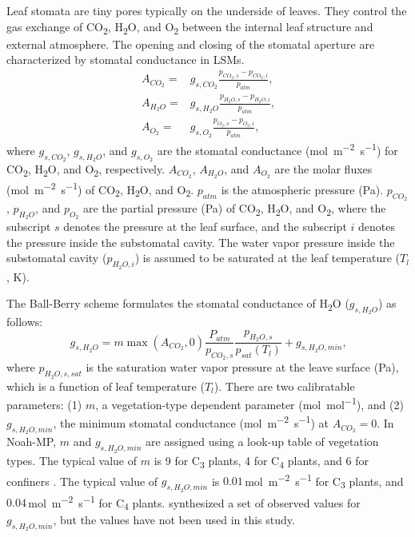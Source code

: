 \documentclass[essd]{copernicus}
\begin{document}
Leaf stomata are tiny pores typically on the underside of leaves. They control
the gas exchange of CO\textsubscript{2}, H\textsubscript{2}O, and
O\textsubscript{2} between the internal leaf structure and external atmosphere.
The opening and closing of the stomatal aperture are characterized by stomatal
conductance in LSMs.
\begin{align}
  A_{CO_2} = & g_{s,CO_2} \frac{p_{CO_2,s} - p_{CO_2,i}}{p_{atm}} \text{,} \\
  A_{H_2O} = & g_{s,H_2O} \frac{p_{H_2O,s} - p_{H_2O,i}}{p_{atm}} \text{,} \\
  A_{O_2} =  & g_{s,O_2} \frac{p_{O_2,s} - p_{O_2,i}}{p_{atm}} \text{,}
\end{align}
where \(g_{s,CO_2}\), \(g_{s,H_2O}\), and \(g_{s,O_2}\) are the stomatal
conductance (\si{mol~m^{-2}~s^{-1}}) for CO\textsubscript{2},
H\textsubscript{2}O, and O\textsubscript{2}, respectively. \(A_{CO_2}\),
\(A_{H_2O}\), and \(A_{O_2}\) are the molar fluxes (\si{mol~m^{-2}~s^{-1}}) of
CO\textsubscript{2}, H\textsubscript{2}O, and O\textsubscript{2}. \(p_{atm}\) is
the atmospheric pressure (\si{Pa}). \(p_{CO_2}\), \(p_{H_2O}\), and \(p_{O_2}\)
are the partial pressure (\si{Pa}) of CO\textsubscript{2}, H\textsubscript{2}O,
and O\textsubscript{2}, where the subscript \(s\) denotes the pressure at the
leaf surface, and the subscript \(i\) denotes the pressure inside the
substomatal cavity. The water vapor pressure inside the substomatal cavity
(\(p_{H_2O,i}\)) is assumed to be saturated at the leaf temperature (\(T_l\),
\si{K}).

The Ball-Berry scheme \citep{ball1987PiPR, collatz1991AFM, collatz1992FPB}
formulates the stomatal conductance of H\textsubscript{2}O (\(g_{s,H_2O}\)) as
follows:
\begin{equation}
  g_{s,H_2O} = m \max(A_{CO_2},0) \frac{P_{atm}}{p_{CO_2,s}}\frac{p_{H_2O,s}}{p_{sat}(T_l)} + g_{s,H_2O,min} \text{,}
\end{equation}
where \(p_{H_2O,s,sat}\) is the saturation water vapor pressure at the leave
surface (\si{Pa}), which is a function of leaf temperature (\(T_l\)). There are
two calibratable parameters: (1) \(m\), a vegetation-type dependent parameter
(\si{mol~mol^{-1}}), and (2) \(g_{s,H_2O,min}\), the minimum stomatal
conductance (\si{mol~m^{-2}~s^{-1}}) at \(A_{CO_2} = 0\). In Noah-MP, \(m\) and
\(g_{s,H_2O,min}\) are assigned using a look-up table of vegetation types. The
typical value of \(m\) is 9 for C\textsubscript{3} plants, 4 for
C\textsubscript{4} plants, and 6 for confiners \citep{sellers1996JCa}. The
typical value of \(g_{s,H_2O,min}\) is \(0.01\)\,\si{mol~m^{-2}~s^{-1}} for
C\textsubscript{3} plants, and \(0.04\)\,\si{mol~m^{-2}~s^{-1}} for
C\textsubscript{4} plants. \citet{Lombardozzi2017GMD} synthesized a set of
observed values for \(g_{s,H_2O,min}\), but the values have not been used in
this study.
\end{document}

